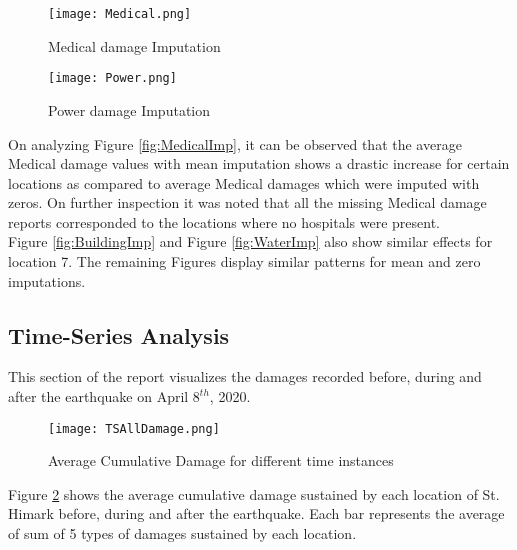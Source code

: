 \documentclass[12pt]{extarticle}
\begin{document}
\begin{figure}[H]
	\centering
	\begin{minipage}{0.5\textwidth}
		\centering
		\texttt{[image: Medical.png]}
		\caption{Medical damage Imputation}
		\label{fig:MedicalImp}
	\end{minipage}%
	\begin{minipage}{0.5\textwidth}
		\centering
		\texttt{[image: Power.png]}
		\caption{Power damage Imputation}
		\label{fig:PowerImp}
	\end{minipage}
\end{figure} 

On analyzing Figure \ref{fig:MedicalImp}, it can be observed that the average Medical damage values with mean imputation shows a drastic increase for certain locations as compared to average Medical damages which were imputed with zeros. On further inspection it was noted that all the missing Medical damage reports corresponded to the locations where no hospitals were present. \\  

Figure \ref{fig:BuildingImp} and Figure \ref{fig:WaterImp} also show similar effects for location 7. The remaining Figures display similar patterns for mean and zero imputations.  \\

\subsection{Time-Series Analysis}
 This section of the report visualizes the damages recorded before, during and after the earthquake on April $8^{th}$, 2020. 

\begin{figure}[H]
\centering
	\texttt{[image: TSAllDamage.png]}
	\caption{Average Cumulative Damage for different time instances }
	\label{fig:TSA}
\end{figure}

Figure \ref{fig:TSA} shows the average cumulative damage sustained by each location of St. Himark before, during and after the earthquake. Each bar represents the average of sum of 5 types of damages sustained by each location. \\

\end{document}
